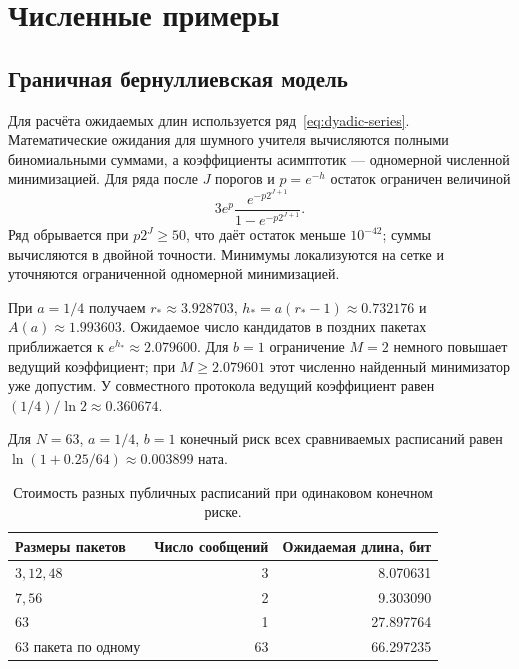 \section{Численные примеры}
\label{sec:validation}

\subsection{Граничная бернуллиевская модель}

Для расчёта ожидаемых длин используется ряд~\eqref{eq:dyadic-series}.
Математические ожидания для шумного учителя вычисляются полными
биномиальными суммами, а коэффициенты асимптотик --- одномерной
численной минимизацией.
Для ряда после $J$ порогов и $p=e^{-h}$ остаток ограничен величиной
\[
 3e^p\frac{e^{-p2^{J+1}}}{1-e^{-p2^{J+1}}}.
\]
Ряд обрывается при $p2^J\ge50$, что даёт остаток меньше $10^{-42}$;
суммы вычисляются в двойной точности. Минимумы локализуются на сетке и
уточняются ограниченной одномерной минимизацией.

\begin{table}[ht]
\centering
\caption{Численная оценка минимизатора замороженного протокола. Параметр $b$
не входит в ведущий коэффициент.}

\label{tab:coef}
\end{table}

При $a=1/4$ получаем $r_*\approx3.928703$,
$h_*=a(r_*-1)\approx0.732176$ и $A(a)\approx1.993603$.
Ожидаемое число кандидатов в поздних пакетах приближается к
$e^{h_*}\approx2.079600$. Для $b=1$ ограничение $M=2$ немного повышает
ведущий коэффициент; при $M\ge2.079601$ этот численно найденный минимизатор
уже допустим. У совместного протокола ведущий коэффициент равен
$(1/4)/\ln2\approx0.360674$.

Для $N=63$, $a=1/4$, $b=1$ конечный риск всех сравниваемых расписаний равен
$\ln(1+0.25/64)\approx0.003899$ ната.

\begin{table}[ht]
\centering
\caption{Стоимость разных публичных расписаний при одинаковом конечном риске.}
\begin{tabular}{lrr}
\toprule
Размеры пакетов & Число сообщений & Ожидаемая длина, бит\\
\midrule
$3,12,48$ & 3 & 8.070631\\
$7,56$ & 2 & 9.303090\\
$63$ & 1 & 27.897764\\
63 пакета по одному & 63 & 66.297235\\
\bottomrule
\end{tabular}
\label{tab:N63}
\end{table}

